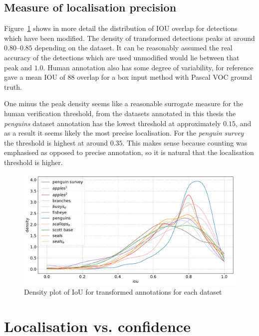 \subsection {Measure of localisation precision}
\label{sec:localisation_precision}

Figure~\ref{fig:density_iou} shows in more detail the distribution of \gls{IOU} overlap for detections which have been modified. The density of transformed detections peaks at around $0.80$--$0.85$ depending on the dataset. It can be reasonably assumed the real accuracy of the detections which are used unmodified would lie between that peak and $1.0$. Human annotation also has some degree of variability, for reference \cite{Papadopoulos2017} gave a mean \gls{IOU} of 88 overlap for a box input method with Pascal VOC ground truth.

One minus the peak density seems like a reasonable surrogate measure for the human verification threshold, from the datasets annotated in this thesis the \emph{penguins} dataset annotation has the lowest threshold at approximately $0.15$, and as a result it seems likely the most precise localisation. For the \emph{penguin survey} the threshold is highest at around $0.35$. This makes sense because counting was emphasised as opposed to precise annotation, so it is natural that the localisation threshold is higher. 


\begin{figure}[ht]
\centering
\includegraphics[width=1.0\linewidth]{charts/scatters/iou_dataset.pdf}
\caption{ Density plot of IoU for transformed annotations for each dataset }
\label{fig:density_iou}
\end{figure}


\section{Localisation vs. confidence}
\label{sec:localisation_confidence}

